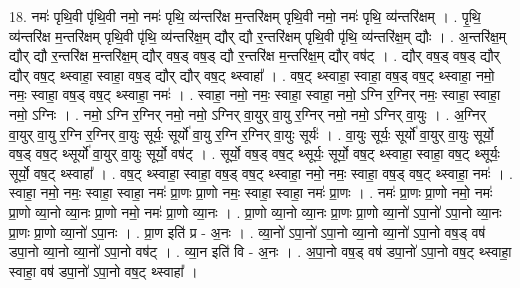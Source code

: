 \documentclass[17pt]{extarticle}
\begin{document}
18. नमः॑ पृथि॒वी पृ॑थि॒वी नमो॒ नमः॑ पृथि॒ व्य॑न्तरि॑क्ष म॒न्तरि॑क्षम् पृथि॒वी नमो॒ नमः॑ पृथि॒ व्य॑न्तरि॑क्षम् । . पृ॒थि॒ व्य॑न्तरि॑क्ष म॒न्तरि॑क्षम् पृथि॒वी पृ॑थि॒ व्य॑न्तरि॑क्ष॒म् द्यौर् द्यौ र॒न्तरि॑क्षम् पृथि॒वी पृ॑थि॒ व्य॑न्तरि॑क्ष॒म् द्यौः । . अ॒न्तरि॑क्ष॒म् द्यौर् द्यौ र॒न्तरि॑क्ष म॒न्तरि॑क्ष॒म् द्यौर् वष॒ड् वष॒ड् द्यौ र॒न्तरि॑क्ष म॒न्तरि॑क्ष॒म् द्यौर् वष॑ट् । . द्यौर् वष॒ड् वष॒ड् द्यौर् द्यौर् वष॒ट् थ्स्वाहा॒ स्वाहा॒ वष॒ड् द्यौर् द्यौर् वष॒ट् थ्स्वाहा᳚ । . वष॒ट् थ्स्वाहा॒ स्वाहा॒ वष॒ड् वष॒ट् थ्स्वाहा॒ नमो॒ नमः॒ स्वाहा॒ वष॒ड् वष॒ट् थ्स्वाहा॒ नमः॑ । . स्वाहा॒ नमो॒ नमः॒ स्वाहा॒ स्वाहा॒ नमो॒ ऽग्नि र॒ग्निर् नमः॒ स्वाहा॒ स्वाहा॒ नमो॒ ऽग्निः । . नमो॒ ऽग्नि र॒ग्निर् नमो॒ नमो॒ ऽग्निर् वा॒युर् वा॒यु र॒ग्निर् नमो॒ नमो॒ ऽग्निर् वा॒युः । . अ॒ग्निर् वा॒युर् वा॒यु र॒ग्नि र॒ग्निर् वा॒युः सूर्यः॒ सूर्यो॑ वा॒यु र॒ग्नि र॒ग्निर् वा॒युः सूर्यः॑ । . वा॒युः सूर्यः॒ सूर्यो॑ वा॒युर् वा॒युः सूर्यो॒ वष॒ड् वष॒ट् थ्सूर्यो॑ वा॒युर् वा॒युः सूर्यो॒ वष॑ट् । . सूर्यो॒ वष॒ड् वष॒ट् थ्सूर्यः॒ सूर्यो॒ वष॒ट् थ्स्वाहा॒ स्वाहा॒ वष॒ट् थ्सूर्यः॒ सूर्यो॒ वष॒ट् थ्स्वाहा᳚ । . वष॒ट् थ्स्वाहा॒ स्वाहा॒ वष॒ड् वष॒ट् थ्स्वाहा॒ नमो॒ नमः॒ स्वाहा॒ वष॒ड् वष॒ट् थ्स्वाहा॒ नमः॑ । . स्वाहा॒ नमो॒ नमः॒ स्वाहा॒ स्वाहा॒ नमः॑ प्रा॒णः प्रा॒णो नमः॒ स्वाहा॒ स्वाहा॒ नमः॑ प्रा॒णः । . नमः॑ प्रा॒णः प्रा॒णो नमो॒ नमः॑ प्रा॒णो व्या॒नो व्या॒नः प्रा॒णो नमो॒ नमः॑ प्रा॒णो व्या॒नः । . प्रा॒णो व्या॒नो व्या॒नः प्रा॒णः प्रा॒णो व्या॒नो॑ ऽपा॒नो॑ ऽपा॒नो व्या॒नः प्रा॒णः प्रा॒णो व्या॒नो॑ ऽपा॒नः । . प्रा॒ण इति॑ प्र - अ॒नः । . व्या॒नो॑ ऽपा॒नो॑ ऽपा॒नो व्या॒नो व्या॒नो॑ ऽपा॒नो वष॒ड् वष॑ डपा॒नो व्या॒नो व्या॒नो॑ ऽपा॒नो वष॑ट् । . व्या॒न इति॑ वि - अ॒नः । . अ॒पा॒नो वष॒ड् वष॑ डपा॒नो॑ ऽपा॒नो वष॒ट् थ्स्वाहा॒ स्वाहा॒ वष॑ डपा॒नो॑ ऽपा॒नो वष॒ट् थ्स्वाहा᳚ । \newline
\end{document}
